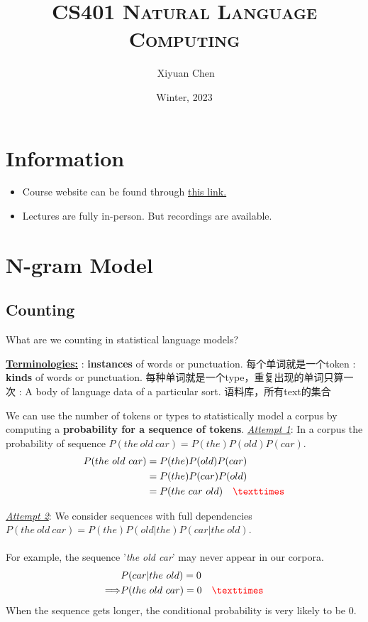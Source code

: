 \documentclass{ainote}
\author{\ccLogo \,\,Xiyuan Chen}
\title{\textsc{CS401 Natural Language Computing}}
\date{Winter, 2023}
\begin{document}
\maketitle
\doclicenseThis
\section*{Information}
\begin{itemize}
	\item Course website can be found through \href{https://www.cs.toronto.edu/~raeidsaqur/csc401/}{this link. }
	\item Lectures are fully in-person. But recordings are available.
\end{itemize}
\tableofcontents
\newpage

\section{N-gram Model}

\subsection{Counting}
What are we counting in statistical language models?
\begin{info}
\textbf{\underline{Terminologies:}}
\spskip[1]
: \textbf{instances} of words or punctuation. 每个单词就是一个token
\spskip
{}: \textbf{kinds} of words or punctuation. 每种单词就是一个type，重复出现的单词只算一次
\spskip
{}: A body of language data of a particular sort. 语料库，所有text的集合
\end{info}
We can use the number of tokens or types to statistically model a corpus by computing a \textbf{probability for a sequence of tokens}.
\spskip
\textit{\underline{Attempt 1}}: In a corpus the probability of sequence $P(the\ old\ car) = P(the)P(old)P(car)$. \\
\begin{align*}
    P(the\ old\ car)&=P(the)P(old)P(car)\\
    &=P(the)P(car)P(old)\\
    &=P(the\ car\ old)\quad\red{×}
\end{align*}

\textit{\underline{Attempt 2}}: We consider sequences with full dependencies $P(the\ old\ car)=P(the)P(old|the)P(car|the\ old)$.\\
\\
For example, the sequence '\textit{the old car}' may never appear in our corpora. 
\begin{align*}
    &P(car|the\ old)=0\\
    \Longrightarrow &P(the\ old\ car)=0\quad\red{×}
\end{align*}
When the sequence gets longer, the conditional probability is very likely to be 0.
\end{document}
